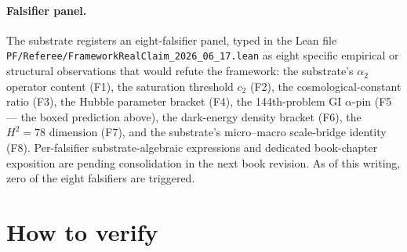 \documentclass[11pt,a4paper]{amsart}
\theoremstyle{plain}
\theoremstyle{definition}
\begin{document}
\paragraph{Falsifier panel.} The substrate registers an eight-falsifier panel, typed in the Lean file \texttt{PF/Referee/FrameworkRealClaim\_2026\_06\_17.lean} as eight specific empirical or structural observations that would refute the framework: the substrate's $\alpha_2$ operator content (F1), the saturation threshold $c_2$ (F2), the cosmological-constant ratio (F3), the Hubble parameter bracket (F4), the 144th-problem GI $\alpha$-pin (F5 --- the boxed prediction above), the dark-energy density bracket (F6), the $H^2 = 78$ dimension (F7), and the substrate's micro--macro scale-bridge identity (F8). Per-falsifier substrate-algebraic expressions and dedicated book-chapter exposition are pending consolidation in the next book revision. As of this writing, zero of the eight falsifiers are triggered.

\section{How to verify}\label{sec:verify}
\end{document}
